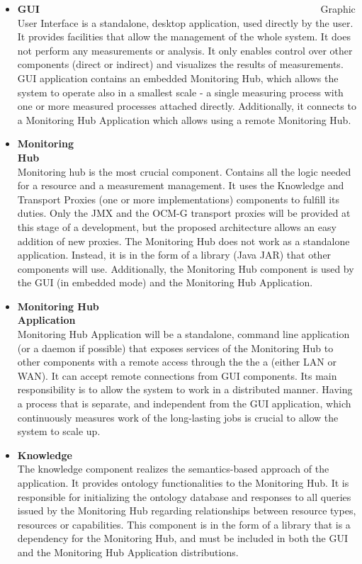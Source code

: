 \begin{itemize}

\item {\bf GUI}~~~~~~~~~~~~~~~~~~~~~~~~~~~~~~~~~~~~~~~~~~~~~~~~~~~~~~~~\linebreak
Graphic User Interface is a standalone, desktop application, used directly by the user. It provides facilities that allow the management of the whole system. It does not perform any measurements or analysis. It only enables control over other components (direct or indirect) and visualizes the results of measurements.
GUI application contains an embedded Monitoring Hub, which allows the system to operate also in a smallest scale - a single measuring process with one or more measured processes attached directly. Additionally, it connects to a Monitoring Hub Application which allows using a remote Monitoring Hub.

\item {\bf Monitoring Hub}~~~~~~~~~~~~~~~~~~~~~~~~~~~~~~~~~~~~~~~~~~~~~~~~~~~~~~~~\linebreak
Monitoring hub is the most crucial component. Contains all the logic needed for a resource and a measurement management. It uses the Knowledge and Transport Proxies (one or more implementations) components to fulfill its duties. Only the JMX and the OCM-G transport proxies will be provided at this stage of a development, but the proposed architecture allows an easy addition of new proxies.
The Monitoring Hub does not work as a standalone application. Instead, it is in the form of a library (Java JAR) that other components will use. Additionally, the Monitoring Hub component is used by the GUI (in embedded mode) and the Monitoring Hub Application.

\item {\bf Monitoring Hub Application}~~~~~~~~~~~~~~~~~~~~~~~~~~~~~~~~~~~~~~~~~~~~~~~~~~~~~~~~\linebreak
Monitoring Hub Application will be a standalone, command line application (or a daemon if possible) that exposes services of the Monitoring Hub to other components with a remote access through the the a (either LAN or WAN). It can accept remote connections from GUI components.
Its main responsibility is to allow the system to work in a distributed manner. Having a process that is separate, and independent from the GUI application, which continuously measures work of the long-lasting jobs is crucial to allow the system to scale up.


\item {\bf Knowledge}~~~~~~~~~~~~~~~~~~~~~~~~~~~~~~~~~~~~~~~~~~~~~~~~~~~~~~~~\linebreak
The knowledge component realizes the semantics-based approach of the application. It provides ontology functionalities to the Monitoring Hub. It is responsible for initializing the ontology database and responses to all queries issued by the Monitoring Hub regarding relationships between resource types, resources or capabilities. This component is in the form of a library that is a dependency for the Monitoring Hub, and must be included in both the GUI and the Monitoring Hub Application distributions.


\end{itemize}
